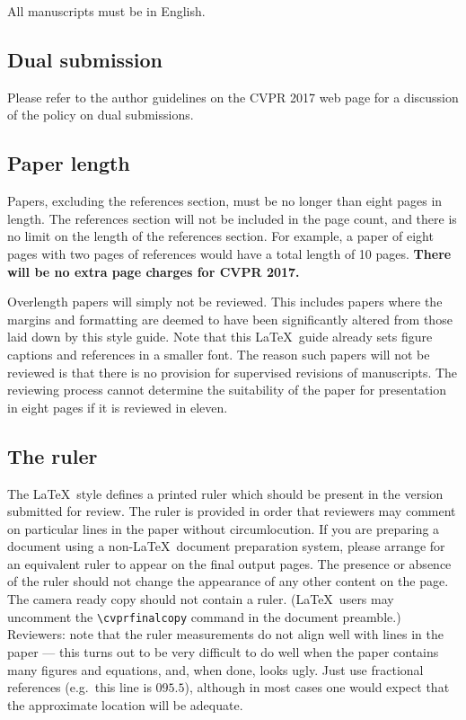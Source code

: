 \documentclass[10pt,twocolumn,letterpaper]{article}
\begin{document}
All manuscripts must be in English.

\subsection{Dual submission}

Please refer to the author guidelines on the CVPR 2017 web page for a
discussion of the policy on dual submissions.

\subsection{Paper length}
Papers, excluding the references section,
must be no longer than eight pages in length. The references section
will not be included in the page count, and there is no limit on the
length of the references section. For example, a paper of eight pages
with two pages of references would have a total length of 10 pages.
{\bf There will be no extra page charges for
  CVPR 2017.}

Overlength papers will simply not be reviewed.  This includes papers
where the margins and formatting are deemed to have been significantly
altered from those laid down by this style guide.  Note that this
\LaTeX\ guide already sets figure captions and references in a smaller font.
The reason such papers will not be reviewed is that there is no provision for
supervised revisions of manuscripts.  The reviewing process cannot determine
the suitability of the paper for presentation in eight pages if it is
reviewed in eleven.  

\subsection{The ruler}
The \LaTeX\ style defines a printed ruler which should be present in the
version submitted for review.  The ruler is provided in order that
reviewers may comment on particular lines in the paper without
circumlocution.  If you are preparing a document using a non-\LaTeX\
document preparation system, please arrange for an equivalent ruler to
appear on the final output pages.  The presence or absence of the ruler
should not change the appearance of any other content on the page.  The
camera ready copy should not contain a ruler. (\LaTeX\ users may uncomment
the \verb'\cvprfinalcopy' command in the document preamble.)  Reviewers:
note that the ruler measurements do not align well with lines in the paper
--- this turns out to be very difficult to do well when the paper contains
many figures and equations, and, when done, looks ugly.  Just use fractional
references (e.g.\ this line is $095.5$), although in most cases one would
expect that the approximate location will be adequate.
\end{document}
